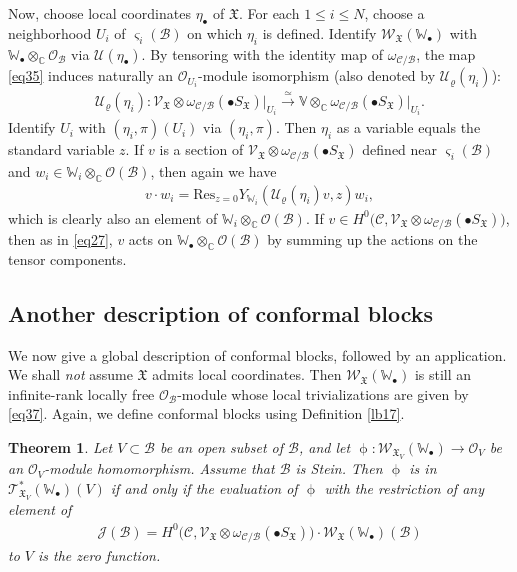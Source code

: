 \documentclass[12pt,a4paper,notitlepage]{article}
\theoremstyle{definition}
\theoremstyle{plain}
\newtheorem{thm}[df]{Theorem}
\newcommand{\fk}{\mathfrak}
\newcommand{\mc}{\mathcal}
\newcommand{\Res}{\mathrm{Res}}
\newcommand{\scr}{\mathscr}
\newcommand{\sgm}{\varsigma}
\newcommand{\SX}{S_{\fk X}}
\newcommand{\blt}{\bullet}
\newcommand{\Vbb}{\mathbb V}
\newcommand{\Wbb}{\mathbb W}
\newcommand{\Cbb}{\mathbb C}
\numberwithin{equation}{section}
\begin{document}
Now, choose local coordinates $\eta_\blt$ of $\fk X$. For each $1\leq i\leq N$, choose a neighborhood $U_i$ of $\sgm_i(\mc B)$ on which $\eta_i$ is defined. Identify $\scr W_{\fk X}(\Wbb_\blt)$ with $\Wbb_\blt\otimes_\Cbb\scr O_{\mc B}$ via $\mc U(\eta_\blt)$. By tensoring with the identity map of $\omega_{\mc C/\mc B}$,  the map \eqref{eq35} induces naturally an $\scr O_{U_i}$-module isomorphism (also denoted by $\mc U_\varrho(\eta_i)$):
\begin{align*}
\mc U_\varrho(\eta_i):\scr V_{\fk X}\otimes\omega_{\mc C/\mc B}(\blt S_{\fk X})\big|_{U_i}\xrightarrow{\simeq}\Vbb\otimes_{\Cbb}\omega_{\mc C/\mc B}(\blt S_{\fk X})\big|_{U_i}.
\end{align*}
Identify $U_i$ with $(\eta_i,\pi)(U_i)$ via $(\eta_i,\pi)$. Then $\eta_i$ as a variable equals the standard variable $z$. If $v$ is a section of $\scr V_{\fk X}\otimes\omega_{\mc C/\mc B}(\blt S_{\fk X})$ defined near $\sgm_i(\mc B)$ and $w_i\in\Wbb_i\otimes_\Cbb\scr O(\mc B)$,  \index{vw@$v\cdot w_i,v\cdot w_\blt$}   then again we have
\begin{align}
v\cdot w_i=\Res_{z=0}Y_{\Wbb_i}(\mc U_\varrho(\eta_i)v,z)w_i,\label{eq55}
\end{align}
which is clearly also an element of $\Wbb_i\otimes_\Cbb\scr O(\mc B)$. If $v\in H^0\big(\mc C,\scr V_{\fk X}\otimes\omega_{\mc C/\mc B}(\blt\SX)\big)$, then as in \eqref{eq27}, $v$ acts on $\Wbb_\blt\otimes_\Cbb\scr O(\mc B)$ by summing up the actions on the tensor components.


\subsection*{Another description of conformal blocks}

We now give a global description of conformal blocks, followed by an application. We shall \emph{not} assume $\fk X$ admits local coordinates. Then $\scr W_{\fk X}(\Wbb_\blt)$ is still an infinite-rank locally free $\scr O_{\mc B}$-module whose local trivializations are given by \eqref{eq37}. Again, we define conformal blocks using Definition \ref{lb17}.


\begin{thm}\label{lb18}
Let $V\subset \mc B$ be an open subset of $\mc B$, and let $\upphi:\scr W_{\fk X_V}(\Wbb_\blt)\rightarrow\scr O_V$ be an $\scr O_V$-module homomorphism. Assume that $\mc B$ is Stein. Then $\upphi$ is in $\scr T_{\fk X_V}^*(\Wbb_\blt)(V)$ if and only if the  evaluation of $\upphi$ with the restriction  of any element \index{JB@$\scr J(\mc B)$} of 
\begin{align}
\scr J(\mc B)=H^0\big(\mc C,\scr V_{\fk X}\otimes\omega_{\mc C/\mc B}(\blt\SX)\big)\cdot \scr W_{\fk X}(\Wbb_\blt)(\mc B)\label{eq51}
\end{align}
to $V$ is the zero function.
\end{thm}
\end{document}
